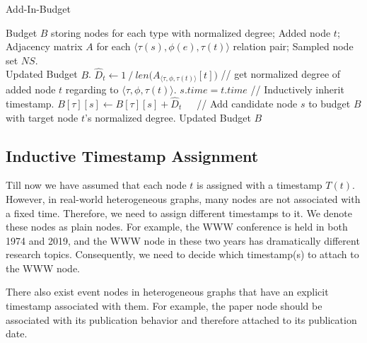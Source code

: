 \documentclass[sigconf]{acmart}
\theoremstyle{definition}
\begin{document}
\begin{algorithm}[tb] 
\caption{Add-In-Budget} 
\label{alg:budget} 
\begin{algorithmic}[1] 
\REQUIRE
Budget $B$ storing nodes for each type with normalized degree; Added node $t$; Adjacency matrix $A$ for each $\langle \tau(s), \phi(e), \tau(t) \rangle$ relation pair; Sampled node set $NS$.\\
\ENSURE
Updated Budget $B$.
\STATE  $\hat{D}_t \gets 1 \ /\ len\Big(A_{\langle \tau, \phi, \tau(t) \rangle}[t]\Big)$ // get normalized degree of added node $t$ regarding to $\langle \tau, \phi, \tau(t) \rangle$.
             \label{line:check}
                     \STATE  $s.time = t.time$ // Inductively inherit timestamp. \label{line:time}
                 \ENDIF
                \STATE  $B[\tau][s] \gets B[\tau][s] + \hat{D}_t$\ \ \ // Add candidate node $s$ to budget $B$ with target node $t$'s normalized degree. \label{line:update}
            \ENDIF
        \ENDFOR  
    \ENDFOR
\RETURN Updated Budget $B$
\end{algorithmic} 
\end{algorithm}



 

\subsection{ Inductive Timestamp Assignment}

Till now we have assumed that each node $t$ is assigned with a timestamp $T(t)$. However, in real-world heterogeneous graphs, many nodes are not associated with a fixed time. Therefore, we need to assign different timestamps to it. We denote these nodes as {plain nodes}. For example, the WWW conference is held in both 1974 and 2019, and the WWW node in these two years has dramatically different research topics. Consequently, we need to decide which timestamp(s) to attach to the WWW node. 

There also exist {event nodes} in heterogeneous graphs that have an explicit timestamp associated with them. 
For example, the paper node should be associated with its publication behavior and therefore attached to its publication date. 
\end{document}
